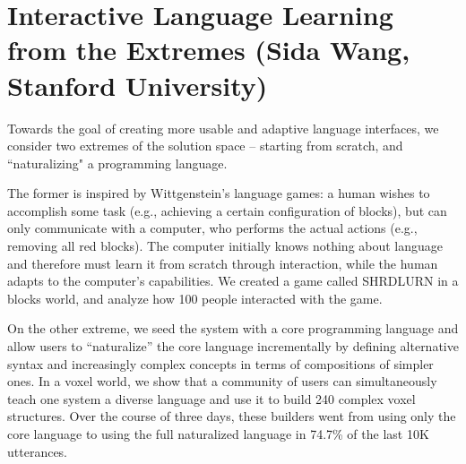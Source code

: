 \section{Interactive Language Learning from the Extremes (Sida Wang, Stanford University)}

Towards the goal of creating more usable and adaptive language interfaces, we consider two extremes of the solution space -- starting from scratch, and ``naturalizing" a programming language.

The former is inspired by Wittgenstein's language games: a human wishes to accomplish some task (e.g., achieving a certain configuration of blocks), but can only communicate with a computer, who performs the actual actions (e.g., removing all red blocks). The computer initially knows nothing about language and therefore must learn it from scratch through interaction, while the human adapts to the computer's capabilities. We created a game called SHRDLURN in a blocks world, and analyze how 100 people interacted with the game.

On the other extreme, we seed the system with a core programming language and allow users to ``naturalize'' the core language incrementally by defining alternative syntax and increasingly complex concepts in terms of compositions of simpler ones. In a voxel world, we show that a community of users can simultaneously teach one system a diverse language and use it to build 240 complex voxel structures. Over the course of three days, these builders went from using only the core language to using the full naturalized language in 74.7\% of the last 10K utterances.